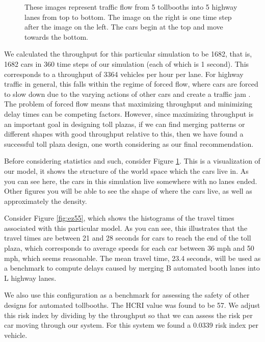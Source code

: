 \documentclass[a4paper, 11pt]{article}
\begin{document}
\begin{figure}
\begin{center}
\begin{tabular}{c c}
\end{tabular}
\end{center}
\caption{These images represent traffic flow from 5 tollbooths into 5 highway lanes from top to bottom. The image on the right is one time step after the image on the left. The cars begin at the top and move towards the bottom.}
\label{fig:5By5}
\end{figure}

We calculated the throughput for this particular simulation to be 1682, that is, 1682 cars in 360 time steps of our simulation (each of which is 1 second). This corresponds to a throughput of 3364 vehicles per hour per lane. For highway traffic in general, this falls within the regime of forced flow, where cars are forced to slow down due to the varying actions of other cars and create a traffic jam \cite{herman}. The problem of forced flow means that maximizing throughput and minimizing delay times can be competing factors. However, since maximizing throughput is an important goal in designing toll plazas, if we can find merging patterns or different shapes with good throughput relative to this, then we have found a successful toll plaza design, one worth considering as our final recommendation.




%
%

Before considering statistics and such, consider Figure \ref{fig:5By5}. This is a visualization of our model, it shows the structure of the world space which the cars live in. As you can see here, the cars in this simulation live somewhere with no lanes ended. Other figures you will be able to see the shape of where the cars live, as well as approximately the density. 

Consider Figure \ref{fig:ez55}, which shows the histograms of the travel times associated with this particular model. As you can see, this illustrates that the travel times are between 21 and 28 seconds for cars to reach the end of the toll plaza, 
which corresponds to average speeds for each car between 36 mph and 50 mph, which seems reasonable. %
The mean travel time, 23.4 seconds, will be used as a benchmark to compute delays caused by merging B automated booth lanes into L highway lanes. 

We also use this configuration as a benchmark for assessing the safety of other designs for automated tollbooths. 
The HCRI value was found to be 57. We adjust this risk index by dividing by the throughput so that we can assess the risk per car moving through our system. For this system we found a 0.0339 risk index per vehicle. 
\end{document}
